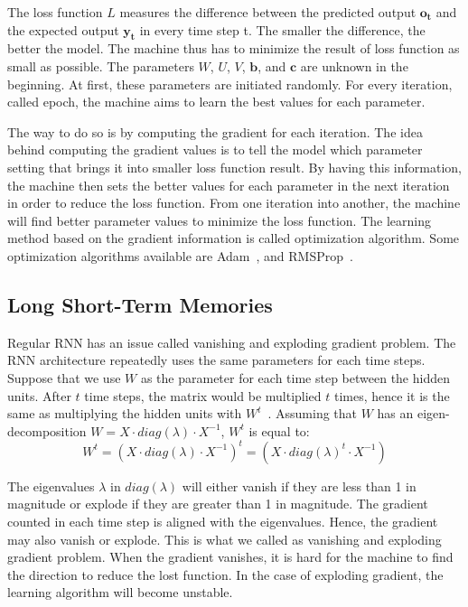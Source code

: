 The loss function $L$ measures the difference between the predicted output $\mathbf{o_{t}}$ and the expected output $\mathbf{y_{t}}$ in every time step t. The smaller the difference, the better the model. The machine thus has to minimize the result of loss function as small as possible. The parameters $W$, $U$, $V$, $\mathbf{b}$, and $\mathbf{c}$ are unknown in the beginning. At first, these parameters are initiated randomly. For every iteration, called epoch, the machine aims to learn the best values for each parameter.

The way to do so is by computing the gradient for each iteration. The idea behind computing the gradient values is to tell the model which parameter setting that brings it into smaller loss function result. By having this information, the machine then sets the better values for each parameter in the next iteration in order to reduce the loss function. From one iteration into another, the machine will find better parameter values to minimize the loss function. The learning method based on the gradient information is called optimization algorithm. Some optimization algorithms available are Adam~\citep{kingma2014adam}, and RMSProp~\citep{tieleman2012lecture}.

\subsection{Long Short-Term Memories}
Regular RNN has an issue called vanishing and exploding gradient problem. The RNN architecture repeatedly uses the same parameters for each time steps. Suppose that we use $W$ as the parameter for each time step between the hidden units. After $t$ time steps, the matrix would be multiplied $t$ times, hence it is the same as multiplying the hidden units with $W^{t}$~\citep{Goodfellow-et-al-2016-Book}. Assuming that $W$ has an eigen-decomposition $W = X \cdot diag(\lambda) \cdot X^{-1}$, $W^{t}$ is equal to:
\begin{equation}
W^{t} = (X \cdot diag(\lambda) \cdot X^{-1})^{t} = (X \cdot diag(\lambda)^{t} \cdot X^{-1})
\end{equation}

The eigenvalues $\lambda$ in $diag(\lambda)$ will either vanish if they are less than 1 in magnitude or explode if they are greater than 1 in magnitude. The gradient counted in each time step is aligned with the eigenvalues. Hence, the gradient may also vanish or explode. This is what we called as vanishing and exploding gradient problem. When the gradient vanishes, it is hard for the machine to find the direction to reduce the lost function. In the case of exploding gradient, the learning algorithm will become unstable.


